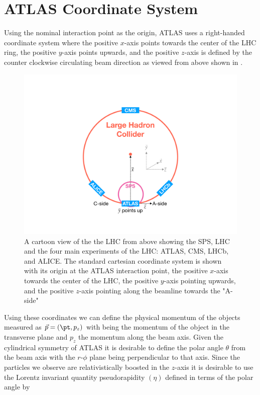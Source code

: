 \section{ATLAS Coordinate System} \label{sec:atlas:coordinates}

Using the nominal interaction point as the origin, ATLAS uses a right-handed
coordinate system where the positive $x$-axis points towards the center of the
LHC ring, the positive $y$-axis points upwards, and the positive $z$-axis is
defined by the counter clockwise circulating beam direction as viewed from
above shown in  \cite{PERF-2007-01}.  
 
\begin{figure}[!htbp]
  \begin{center}
    \includegraphics[width=0.5\linewidth]{figures/atlas/atlas_geometry}
    \caption{ \cite{Stark:2317296} A cartoon view of the the LHC from above
showing the SPS, LHC and the four main experiments of the LHC: ATLAS, CMS, LHCb,
and ALICE.  The standard cartesian coordinate system is shown with its origin at
the ATLAS interaction point, the positive $x$-axis towards the center of the
LHC, the positive $y$-axis pointing upwards, and the positive $z$-axis pointing
along the beamline towards the "A-side"}
    \label{fig:atlas_geometry}
  \end{center}
\end{figure}

Using these coordinates we can define the physical momentum of the objects
measured as $\vec{p} = (\pt,p_z)$ with \pt being the momentum of the object in
the transverse plane and $p_z$ the momentum along the beam axis. Given the
cylindrical symmetry of ATLAS it is desirable to define the polar angle
$\theta$ from the beam axis with the $r$-$\phi$ plane being perpendicular to that
axis. Since the particles we observe are relativistically boosted in the
$z$-axis it is desirable to use the Lorentz invariant quantity pseudorapidity
$(\eta)$ defined in terms of the polar angle by

